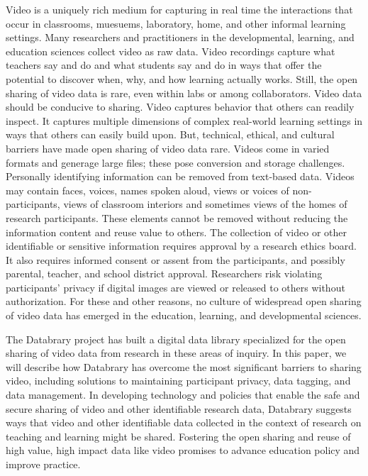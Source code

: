 \documentclass[letterpaper,man,natbib]{apa6}
\begin{document}
Video is a uniquely rich medium for capturing in real time the interactions that occur in classrooms, muesuems, laboratory, home, and other informal learning settings.
Many researchers and practitioners in the developmental, learning, and education sciences collect video as raw data.
Video recordings capture what teachers say and do and what students say and do in ways that offer the potential to discover when, why, and how learning actually works.
Still, the open sharing of video data is rare, even within labs or among collaborators.
Video data should be conducive to sharing.
Video captures behavior that others can readily inspect.
It captures multiple dimensions of complex real-world learning settings in ways that others can easily build upon. But, technical, ethical, and cultural barriers have made open sharing of video data rare.
Videos come in varied formats and generage large files; these pose conversion and storage challenges.
Personally identifying information can be removed from text-based data.
Videos may contain faces, voices, names spoken aloud, views or voices of non-participants, views of classroom interiors and sometimes views of the homes of research participants. 
These elements cannot be removed without reducing the information content and reuse value to others. 
The collection of video or other identifiable or sensitive information requires approval by a research ethics board.
It also requires informed consent or assent from the participants, and possibly parental, teacher, and school district approval.
Researchers risk violating participants’ privacy if digital images are viewed or released to others without authorization.
For these and other reasons, no culture of widespread open sharing of video data has emerged in the education, learning, and developmental sciences. 

The Databrary project has built a digital data library specialized for the open sharing of video data from research in these areas of inquiry.
In this paper, we will describe how Databrary has overcome the most significant barriers to sharing video, including solutions to maintaining participant privacy, data tagging, and data management.
In developing technology and policies that enable the safe and secure sharing of video and other identifiable research data, Databrary suggests ways that video and other identifiable data collected in the context of research on teaching and learning might be shared.
Fostering the open sharing and reuse of high value, high impact data like video promises to advance education policy and improve practice.
\end{document}
